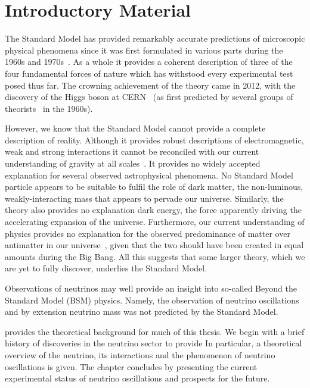 \chapter{Introductory Material}
\label{sec:intro}

The Standard Model has provided remarkably accurate predictions of microscopic physical phenomena since it was first formulated in various parts during the 1960s and 1970s~\cite{glashow1961, weinberg1967, qcdTheory1, qcdTheory2}.
As a whole it provides a coherent description of three of the four fundamental forces of nature which has withstood every experimental test posed thus far. 
The crowning achievement of the theory came in 2012, with the discovery of the Higgs boson at CERN~\cite{higgsDiscoveryATLAS, higgsDiscoveryCMS} (as first predicted by several groups of theorists~\cite{higgsTheory1, higgsTheory2, higgsTheory3} in the 1960s).

However, we know that the Standard Model cannot provide a complete description of reality.
Although it provides robust descriptions of electromagnetic, weak and strong interactions it cannot be reconciled with our current understanding of gravity at all scales~\cite{quantumGravity}.
It provides no widely accepted explanation for several observed astrophysical phenomena.
No Standard Model particle appears to be suitable to fulfil the role of dark matter, the non-luminous, weakly-interacting mass that appears to pervade our universe.
Similarly, the theory also provides no explanation dark energy, the force apparently driving the accelerating expansion of the universe.
Furthermore, our current understanding of physics provides no explanation for the observed predominance of matter over antimatter in our universe~\cite{matterAntimatterAMS}, given that the two should have been created in equal amounts during the Big Bang.
All this suggests that some larger theory, which we are yet to fully discover, underlies the Standard Model.

Observations of neutrinos may well provide an insight into so-called Beyond the Standard Model (BSM) physics.
Namely, the observation of neutrino oscillations~\cite{SNO, superK} and by extension neutrino mass was not predicted by the Standard Model. 

 provides the theoretical background for much of this thesis.
We begin with a brief history of discoveries in the neutrino sector to provide
In particular, a theoretical overview of the neutrino, its interactions and the phenomenon of neutrino oscillations is given.
The chapter concludes by presenting the current experimental status of neutrino oscillations and prospects for the future.

